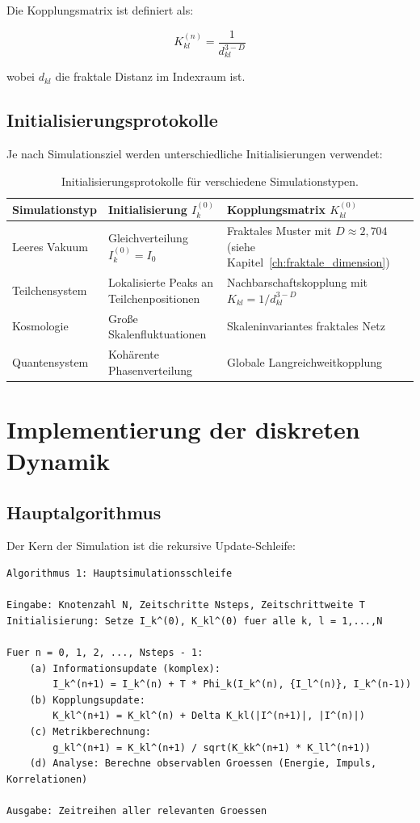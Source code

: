 Die Kopplungsmatrix ist definiert als:

\[
K_{kl}^{(n)} = \frac{1}{d_{kl}^{3-D}}
\]

wobei \( d_{kl} \) die fraktale Distanz im Indexraum ist.

\subsection{Initialisierungsprotokolle}
\label{sub:numerik_initialisierung}

Je nach Simulationsziel werden unterschiedliche Initialisierungen verwendet:

\begin{table}[htbp]
\centering
\small
\begin{tabularx}{\textwidth}{|l|X|X|}
\hline
\textbf{Simulationstyp} & \textbf{Initialisierung \( I_k^{(0)} \)} & \textbf{Kopplungsmatrix \( K_{kl}^{(0)} \)} \\
\hline
Leeres Vakuum & Gleichverteilung \( I_k^{(0)} = I_0 \) & Fraktales Muster mit \( D \approx 2,704 \) (siehe Kapitel~\ref{ch:fraktale_dimension}) \\
Teilchensystem & Lokalisierte Peaks an Teilchenpositionen & Nachbarschaftskopplung mit \( K_{kl} = 1/d_{kl}^{3-D} \) \\
Kosmologie & Große Skalenfluktuationen & Skaleninvariantes fraktales Netz \\
Quantensystem & Kohärente Phasenverteilung & Globale Langreichweitkopplung \\
\hline
\end{tabularx}
\caption{Initialisierungsprotokolle für verschiedene Simulationstypen.}
\label{tab:initialisierung}
\end{table}

\section{Implementierung der diskreten Dynamik}
\label{app:numerik_implementierung}

\subsection{Hauptalgorithmus}
\label{sub:numerik_algorithmus}

Der Kern der Simulation ist die rekursive Update-Schleife:

\begin{verbatim}
Algorithmus 1: Hauptsimulationsschleife

Eingabe: Knotenzahl N, Zeitschritte Nsteps, Zeitschrittweite T
Initialisierung: Setze I_k^(0), K_kl^(0) fuer alle k, l = 1,...,N

Fuer n = 0, 1, 2, ..., Nsteps - 1:
    (a) Informationsupdate (komplex):
        I_k^(n+1) = I_k^(n) + T * Phi_k(I_k^(n), {I_l^(n)}, I_k^(n-1))
    (b) Kopplungsupdate:
        K_kl^(n+1) = K_kl^(n) + Delta K_kl(|I^(n+1)|, |I^(n)|)
    (c) Metrikberechnung:
        g_kl^(n+1) = K_kl^(n+1) / sqrt(K_kk^(n+1) * K_ll^(n+1))
    (d) Analyse: Berechne observablen Groessen (Energie, Impuls, Korrelationen)

Ausgabe: Zeitreihen aller relevanten Groessen
\end{verbatim}

